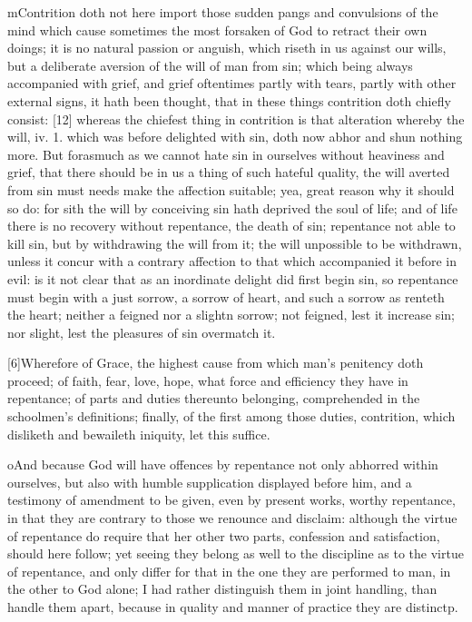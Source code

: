 mContrition doth not here import those sudden pangs and convulsions of the mind which cause sometimes the most forsaken of God to retract their own doings; it is no natural passion or anguish, which riseth in us against our wills, but a deliberate aversion of the will of man from sin; which being always accompanied with grief, and grief oftentimes partly with tears, partly with other external signs, it hath been thought, that in these things contrition doth chiefly consist: [12] whereas the chiefest thing in contrition is that alteration whereby the will, iv. 1. which was before delighted with sin, doth now abhor and shun nothing more. But forasmuch as we cannot hate sin in ourselves without heaviness and grief, that there should be in us a thing of such hateful quality, the will averted from sin must needs make the affection suitable; yea, great reason why it should so do: for sith the will by conceiving sin hath deprived the soul of life; and of life there is no recovery without repentance, the death of sin; repentance not able to kill sin, but by withdrawing the will from it; the will unpossible to be withdrawn, unless it concur with a contrary affection to that which accompanied it before in evil: is it not clear that as an inordinate delight did first begin sin, so repentance must begin with a just sorrow, a sorrow of heart, and such a sorrow as renteth the heart; neither a feigned nor a slightn sorrow; not feigned, lest it increase sin; nor slight, lest the pleasures of sin overmatch it.

[6]Wherefore of Grace, the highest cause from which man’s penitency doth proceed; of faith, fear, love, hope, what force and efficiency they have in repentance; of parts and duties thereunto belonging, comprehended in the schoolmen’s definitions; finally, of the first among those duties, contrition, which disliketh and bewaileth iniquity, let this suffice.

oAnd because God will have offences by repentance not only abhorred within ourselves, but also with humble supplication displayed before him, and a testimony of amendment to be given, even by present works, worthy repentance, in that they are contrary to those we renounce and disclaim: although the virtue of repentance do require that her other two parts, confession and satisfaction, should here follow; yet seeing they belong as well to the discipline as to the virtue of repentance, and only differ for that in the one they are performed to man, in the other to God alone; I had rather distinguish them in joint handling, than handle them apart, because in quality and manner of practice they are distinctp.

